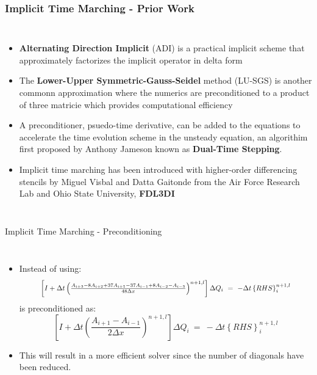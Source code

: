 \begin{frame}\frametitle{Implicit Time Marching - Prior Work}
  \begin{columns}
    \begin{itemize}
      \item \textbf{Alternating Direction Implicit} (ADI) is a practical implicit scheme that 
            approximately factorizes the implicit operator in delta form
      \item The \textbf{Lower-Upper Symmetric-Gauss-Seidel} method (LU-SGS) is another commonn 
          approximation where the numerics are preconditioned to a product of three matricie which 
          provides computational efficiency
      \item A preconditioner, psuedo-time derivative, can be added to the equations to accelerate
        the time evolution scheme in the unsteady equation, an algorithim first proposed by Anthony
        Jameson known as \textbf{Dual-Time Stepping}.
      \item Implicit time marching has been introduced with higher-order differencing stencils
            by Miguel Visbal and Datta Gaitonde from the Air Force Research Lab and Ohio State 
            University, \textbf{FDL3DI}
    \end{itemize}  
  \end{columns}
\end{frame}

\begin{frame}{Implicit Time Marching - Preconditioning}
  \begin{columns}
    \begin{itemize}
		  \item Instead of using:
      \begin{equation}
	      \label{eq:RDRP_NS}\resizebox{0.85\hsize}{!}{$%
  		  \left[I+\Delta{t}\left(\frac{A_{i+3}-8A_{i+2}+37A_{i+1}-37A_{i-1}+8A_{i-2}-A_{i-3}}
        {48\Delta{x}}\right)^{n+1,l}\right]\Delta{Q}_i~=~-\Delta{t}\left\{RHS\right\}_i^{n+1,l}$}
      \end{equation}
      is preconditioned as:
      \begin{equation}
      	\label{eq:TriDi_NS}
        		\left[I+\Delta{t}\left(\frac{A_{i+1}-A_{i-1}}{2\Delta{x}}\right)^{n+1,l}\right]
            \Delta{Q}_i~=~-\Delta{t}\left\{RHS\right\}_i^{n+1, l}
      \end{equation}
		  \item This will result in a more efficient solver since the number of diagonals have been 
            reduced.
    \end{itemize}  
  \end{columns}
\end{frame}

